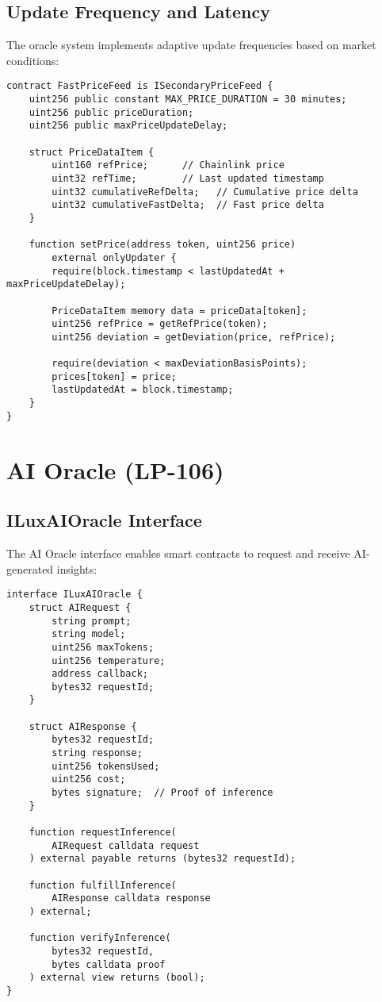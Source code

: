 \documentclass[11pt]{article}
\begin{document}
\subsection{Update Frequency and Latency}

The oracle system implements adaptive update frequencies based on market conditions:

\begin{lstlisting}[caption={Fast Price Feed Implementation}]
contract FastPriceFeed is ISecondaryPriceFeed {
    uint256 public constant MAX_PRICE_DURATION = 30 minutes;
    uint256 public priceDuration;
    uint256 public maxPriceUpdateDelay;
    
    struct PriceDataItem {
        uint160 refPrice;      // Chainlink price
        uint32 refTime;        // Last updated timestamp
        uint32 cumulativeRefDelta;   // Cumulative price delta
        uint32 cumulativeFastDelta;  // Fast price delta
    }
    
    function setPrice(address token, uint256 price) 
        external onlyUpdater {
        require(block.timestamp < lastUpdatedAt + maxPriceUpdateDelay);
        
        PriceDataItem memory data = priceData[token];
        uint256 refPrice = getRefPrice(token);
        uint256 deviation = getDeviation(price, refPrice);
        
        require(deviation < maxDeviationBasisPoints);
        prices[token] = price;
        lastUpdatedAt = block.timestamp;
    }
}
\end{lstlisting}

\section{AI Oracle (LP-106)}

\subsection{ILuxAIOracle Interface}

The AI Oracle interface enables smart contracts to request and receive AI-generated insights:

\begin{lstlisting}[caption={AI Oracle Smart Contract Interface}]
interface ILuxAIOracle {
    struct AIRequest {
        string prompt;
        string model;
        uint256 maxTokens;
        uint256 temperature;
        address callback;
        bytes32 requestId;
    }

    struct AIResponse {
        bytes32 requestId;
        string response;
        uint256 tokensUsed;
        uint256 cost;
        bytes signature;  // Proof of inference
    }

    function requestInference(
        AIRequest calldata request
    ) external payable returns (bytes32 requestId);

    function fulfillInference(
        AIResponse calldata response
    ) external;

    function verifyInference(
        bytes32 requestId,
        bytes calldata proof
    ) external view returns (bool);
}
\end{lstlisting}
\end{document}
